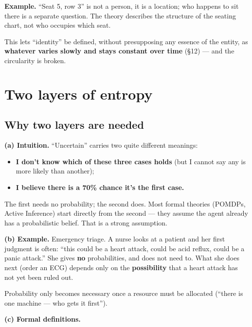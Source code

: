 \documentclass[11pt]{article}
\providecommand{\tightlist}{%
  \setlength{\itemsep}{0pt}\setlength{\parskip}{0pt}}
\renewenvironment{quote}
  {\def\FrameCommand{{\color{gray!60}\vrule width 2pt}\hspace{8pt}}%
   \MakeFramed{\advance\hsize-\width \FrameRestore}\begin{itshape}}
  {\end{itshape}\endMakeFramed}
\begin{document}
\begin{quote}
\textbf{Example.} ``Seat 5, row 3'' is not a person, it is a location; who happens to sit there is a separate question. The theory describes the structure of the seating chart, not who occupies which seat.
\end{quote}

This lets ``identity'' be defined, without presupposing any essence of the entity, as \textbf{whatever varies slowly and stays constant over time} (\S{}12) --- and the circularity is broken.

\hypertarget{two-layers-of-entropy}{%
\section{Two layers of entropy}\label{two-layers-of-entropy}}

\hypertarget{why-two-layers-are-needed}{%
\subsection{Why two layers are needed}\label{why-two-layers-are-needed}}

\textbf{(a) Intuition.} ``Uncertain'' carries two quite different meanings:

\begin{itemize}
\tightlist
\item
  \textbf{I don't know which of these three cases holds} (but I cannot say any is more likely than another);
\item
  \textbf{I believe there is a 70\% chance it's the first case.}
\end{itemize}

The first needs no probability; the second does. Most formal theories (POMDPs, Active Inference) start directly from the second --- they assume the agent already has a probabilistic belief. That is a strong assumption.

\textbf{(b) Example.} Emergency triage. A nurse looks at a patient and her first judgment is often: ``this could be a heart attack, could be acid reflux, could be a panic attack.'' She gives \textbf{no} probabilities, and does not need to. What she does next (order an ECG) depends only on the \textbf{possibility} that a heart attack has not yet been ruled out.

Probability only becomes necessary once a resource must be allocated (``there is one machine --- who gets it first'').

\textbf{(c) Formal definitions.}
\end{document}
